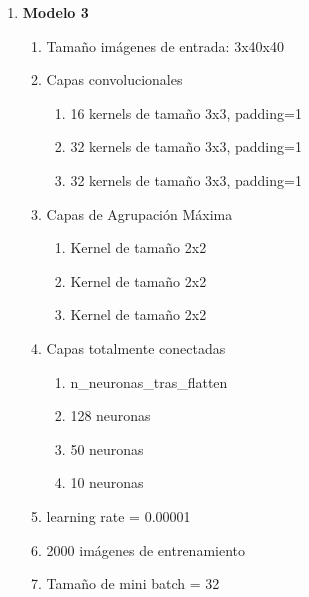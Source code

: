 \begin{enumerate}
	\item \textbf{Modelo 3}
	\begin{enumerate}[label=\textbullet, nosep]
		\item Tamaño imágenes de entrada: 3x40x40
		\item Capas convolucionales
		\begin{enumerate}[label=\textbullet, nosep]
			\item 16 kernels de tamaño 3x3, padding=1
			\item 32 kernels de tamaño 3x3, padding=1
			\item 32 kernels de tamaño 3x3, padding=1
		\end{enumerate}
		\item Capas de Agrupación Máxima
		\begin{enumerate}[label=\textbullet, nosep]
			\item Kernel de tamaño 2x2
			\item Kernel de tamaño 2x2
			\item Kernel de tamaño 2x2
		\end{enumerate}
		\item Capas totalmente conectadas
		\begin{enumerate}[label=\textbullet, nosep]
			\item n\_neuronas\_tras\_flatten
			\item 128 neuronas
			\item 50 neuronas
			\item 10 neuronas
		\end{enumerate}
		\item learning rate = 0.00001
		\item 2000 imágenes de entrenamiento
		\item Tamaño de mini batch = 32
	\end{enumerate}	
	

\end{enumerate}
